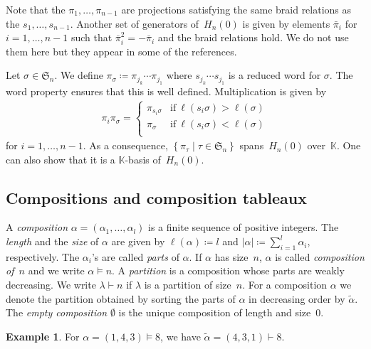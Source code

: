 \documentclass[10pt]{amsart}
\theoremstyle{plain}
\theoremstyle{plain}
\theoremstyle{plain}
\theoremstyle{plain}
\theoremstyle{plain}
\theoremstyle{definition}
\theoremstyle{definition}
\newtheorem{exam}[exam]{Example}
\newcommand{\K}{\mathbb K}
\newcommand{\set}[1]{\left\{ #1 \right\}}
\newcommand{\fS}{\mathfrak{S}}
\newcommand{\fs}{s}
\newcommand{\He}{H_n(0)}
\newcommand{\parts}[2]{{(#1_1, \ldots, #1_{#2})}}
\begin{document}
Note that the $\pi_1,\dots, \pi_{n-1}$ are projections satisfying the same braid relations as the $s_1, \ldots, s_{n-1}$.
Another set of generators of~$\He$ is given by elements $\bar \pi_i$ for $i=1,\dots, n-1$ such that $\bar \pi_i^2 = - \bar \pi_i$ and the braid relations hold.
We do not use them here but they appear in some of the references.

Let $\sigma \in \fS_n$. We define $\pi_\sigma \coloneqq \pi_{j_k} \cdots \pi_{j_1}$ where $\fs_{j_k} \cdots \fs_{j_1}$ is a reduced word for $\sigma$. The word property ensures that this is well defined. Multiplication is given by
\begin{align*}
\pi_i \pi_\sigma = 
\begin{cases}
\pi_{\fs_i \sigma} & \text{if}\ \ell(\fs_i \sigma ) > \ell(\sigma) \\
\pi_{\sigma} & \text{if}\ \ell(\fs_i \sigma ) < \ell(\sigma) \\
\end{cases}
\end{align*}
for $i = 1,\dots, n-1$. 
As a consequence, $\set{\pi_{\tau} \mid \tau \in \fS_n}$ spans~$\He$ over~$\K$. One can also show that it is a $\K$-basis of~$\He$.%


\subsection{Compositions and composition tableaux}
\label{sec:compositions_and_composition_tableaux}

A \emph{composition} $\alpha = \parts{\alpha}l$ is a finite sequence of positive integers. 
The \emph{length} and the \emph{size} of $\alpha$ are given by $\ell(\alpha)\coloneqq l$ and $|\alpha| \coloneqq \sum_{i=1}^l \alpha_i$, respectively.
The $\alpha_i$'s are called \emph{parts} of $\alpha$. If $\alpha$ has size~$n$, $\alpha$ is called \emph{composition of~$n$} and we write $\alpha \vDash n$.
A \emph{partition} is a composition whose parts are weakly decreasing. 
We write $\lambda \vdash n$ if $\lambda$ is a partition of size~$n$.
For a composition $\alpha$ we denote the partition obtained by sorting the parts of $\alpha$ in decreasing order by $\widetilde \alpha$. The \emph{empty composition} $\emptyset$ is the unique composition of length and size~$0$.

\begin{exam} 
	For $\alpha=(1,4,3)\vDash 8$, we have $\widetilde \alpha = (4,3,1)\vdash 8$.
\end{exam}
\end{document}

